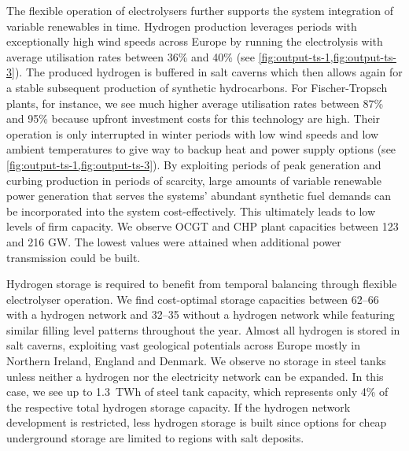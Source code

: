 The flexible operation of electrolysers further supports the system integration
of variable renewables in time. Hydrogen production leverages periods with
exceptionally high wind speeds across Europe by running the electrolysis with
average utilisation rates between 36\% and 40\% (see
\cref{fig:output-ts-1,fig:output-ts-3}).  The produced hydrogen is buffered in
salt caverns which then allows again for a stable subsequent production of
synthetic hydrocarbons. For Fischer-Tropsch plants, for instance, we see much
higher average utilisation rates between 87\% and 95\% because upfront
investment costs for this technology are high. Their operation is only
interrupted in winter periods with low wind speeds and low ambient temperatures
to give way to backup heat and power supply options (see
\cref{fig:output-ts-1,fig:output-ts-3}). By exploiting periods of peak
generation and curbing production in periods of scarcity, large amounts of
variable renewable power generation that serves the systems' abundant synthetic
fuel demands can be incorporated into the system cost-effectively. This
ultimately leads to low levels of firm capacity. We observe OCGT and CHP plant
capacities between 123 and 216 GW\el. The lowest values were attained when
additional power transmission could be built.


Hydrogen storage is required to benefit from temporal balancing through flexible
electrolyser operation. We find cost-optimal storage capacities between
\SIrange{62}{66}{\twh} with a hydrogen network and \SIrange{32}{35}{\twh}
without a hydrogen network while featuring similar filling level patterns
throughout the year. Almost all hydrogen is stored in salt caverns, exploiting
vast geological potentials across Europe mostly in Northern Ireland, England and
Denmark. We observe no storage in steel tanks unless neither a hydrogen nor the
electricity network can be expanded. In this case, we see up to 1.3~TWh of steel
tank capacity, which represents only 4\% of the respective total hydrogen
storage capacity. If the hydrogen network development is restricted, less
hydrogen storage is built since options for cheap underground storage are
limited to regions with salt deposits.

